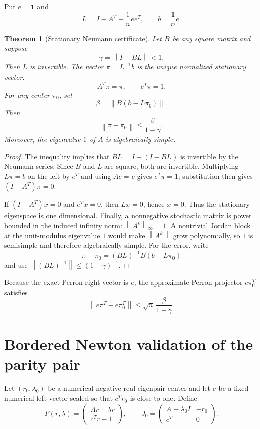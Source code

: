 \documentclass[11pt]{article}
\newtheorem{theorem}{Theorem}[section]
\theoremstyle{definition}
\newcommand{\norm}[1]{\left\lVert#1\right\rVert}
\newcommand{\one}{\mathbf 1}
\begin{document}
Put $e=\one$ and
\begin{equation}
 L=I-A^T+\frac1n ee^T,
 \qquad b=\frac1n e.
 \label{eq:stationary-system}
\end{equation}

\begin{theorem}[Stationary Neumann certificate]
\label{thm:stationary}
Let $B$ be any square matrix and suppose
\[
 \gamma=\norm{I-BL}<1.
\]
Then $L$ is invertible.  The vector $\pi=L^{-1}b$ is the unique normalized
stationary vector:
\[
 A^T\pi=\pi,
 \qquad e^T\pi=1.
\]
For any center $\pi_0$, set
\[
 \beta=\norm{B(b-L\pi_0)}.
\]
Then
\begin{equation}
 \norm{\pi-\pi_0}\le\frac{\beta}{1-\gamma}.
 \label{eq:stationary-error}
\end{equation}
Moreover, the eigenvalue $1$ of $A$ is algebraically simple.
\end{theorem}

\begin{proof}
The inequality implies that $BL=I-(I-BL)$ is invertible by the Neumann
series.  Since $B$ and $L$ are square, both are invertible.  Multiplying
$L\pi=b$ on the left by $e^T$ and using $Ae=e$ gives $e^T\pi=1$; substitution
then gives $(I-A^T)\pi=0$.

If $(I-A^T)x=0$ and $e^Tx=0$, then $Lx=0$, hence $x=0$.  Thus the stationary
eigenspace is one dimensional.  Finally, a nonnegative stochastic matrix is
power bounded in the induced infinity norm: $\norm{A^k}_\infty=1$.  A
nontrivial Jordan block at the unit-modulus eigenvalue $1$ would make
$\norm{A^k}$ grow polynomially, so $1$ is semisimple and therefore
algebraically simple.  For the error, write
\[
 \pi-\pi_0=(BL)^{-1}B(b-L\pi_0)
\]
and use $\norm{(BL)^{-1}}\le(1-\gamma)^{-1}$.
\end{proof}

Because the exact Perron right vector is $e$, the approximate Perron
projector $e\pi_0^T$ satisfies
\begin{equation}
 \norm{e\pi^T-e\pi_0^T}
 \le\sqrt n\,\frac{\beta}{1-\gamma}.
 \label{eq:perron-projector}
\end{equation}

\section{Bordered Newton validation of the parity pair}
\label{sec:right}

Let $(r_0,\lambda_0)$ be a numerical negative real eigenpair center and let
$c$ be a fixed numerical left vector scaled so that $c^Tr_0$ is close to one.
Define
\begin{equation}
 F(r,\lambda)=
 \begin{pmatrix}Ar-\lambda r\\c^Tr-1\end{pmatrix},
 \qquad
 J_0=
 \begin{pmatrix}A-\lambda_0I&-r_0\\c^T&0\end{pmatrix}.
 \label{eq:newton}
\end{equation}
\end{document}
